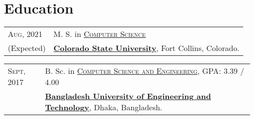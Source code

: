 \documentclass[letterpaper,10pt]{article}
\begin{document}
\section{Education}
\begin{tabular}{p{1.8cm}|l} 

  \textsc{Aug}, 2021 & M. S. in \href{https://compsci.colostate.edu}{\textsc{Computer Science}} \\
 (Expected) & \href{https://www.colostate.edu/}{\textbf{Colorado State University}}, Fort Collins, Colorado.

\end{tabular}

\begin{tabular}{p{1.8cm}|l}
 \textsc{Sept}, 2017 & B. Sc. in \href{https://cse.buet.ac.bd/}{\textsc{Computer Science and Engineering}}, \normalsize \textsc{GPA}: 3.39 / 4.00 \\
 & \href{http://www.buet.ac.bd/}{\textbf{Bangladesh University of Engineering and Technology}}, Dhaka, Bangladesh.

\end{tabular}
\end{document}
